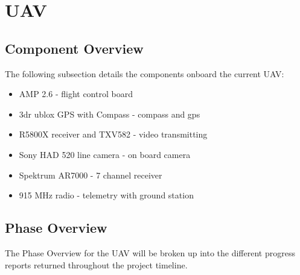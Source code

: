 \section{UAV }\label{uav}


\subsection{Component  Overview}
The following subsection details the components onboard the current UAV:
  \begin{itemize}
    \item AMP 2.6 - flight control board
    \item 3dr ublox GPS with Compass - compass and gps
    \item R5800X receiver and TXV582 - video transmitting
    \item Sony HAD 520 line camera - on board camera
    \item Spektrum AR7000 - 7 channel receiver
    \item 915 MHz radio - telemetry with ground station
  \end{itemize}


\subsection{Phase Overview}
The Phase Overview for the UAV will be broken up into the different progress reports returned throughout the project timeline.

